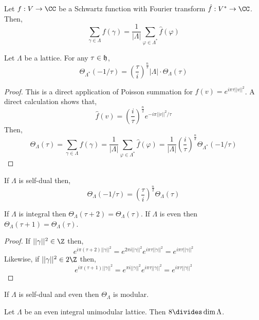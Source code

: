\documentclass[12pt]{article}
\begin{document}
\begin{thm}
Let $f : V \to \CC$ be a Schwartz function with Fourier transform $\hat{f} : V^* \to \CC$. Then,
\[ \sum_{\gamma \in \Lambda} f(\gamma) = \frac{1}{|\Lambda|} \sum_{\varphi \in \Lambda^*} \hat{f}(\varphi) \]
\end{thm}

\begin{prop}
Let $\Lambda$ be a lattice. For any $\tau \in \mathfrak{h}$,
\[ \Theta_{\Lambda^*}(-1/\tau) = \left( \frac{\tau}{i} \right)^{\frac{n}{2}} | \Lambda | \cdot  \Theta_{\Lambda}(\tau) \]
\end{prop}

\begin{proof}
This is a direct application of Poisson summation for $f(v) = e^{i \pi \tau || v ||^2}$. A direct calculation shows that, 
\[ \hat{f}(v) = \left( \frac{i}{\tau} \right)^{\frac{n}{2}} e^{-i \pi || v ||^2 / \tau} \] 
Then,
\[ \Theta_{\Lambda}(\tau) = \sum_{\gamma \in \Lambda} f(\gamma) = \frac{1}{| \Lambda |} \sum_{\varphi \in \Lambda^*} \hat{f}(\varphi) = \frac{1}{|\Lambda|} \left( \frac{i}{\tau} \right)^{\frac{n}{2}} \Theta_{\Lambda^*}(-1/\tau) \]
\end{proof}

\begin{cor}
If $\Lambda$ is self-dual then,
\[ \Theta_{\Lambda}(-1/\tau) = \left( \frac{\tau}{i} \right)^{\frac{n}{2}} \Theta_{\Lambda}(\tau) \]
\end{cor}

\begin{prop}
If $\Lambda$ is integral then $\Theta_{\Lambda}(\tau + 2) = \Theta_{\Lambda}(\tau)$. If $\Lambda$ is even then $\Theta_{\Lambda}(\tau + 1) = \Theta_{\Lambda}(\tau)$.
\end{prop}

\begin{proof}
If $||\gamma||^2 \in \Z$ then,
\[ e^{i \pi (\tau + 2) || \gamma ||^2} = e^{2 \pi i || \gamma ||^2} e^{i \pi \tau || \gamma ||^2} = e^{i \pi \tau || \gamma ||^2} \] Likewise, if $|| \gamma ||^2 \in 2 \Z$ then,
\[ e^{i \pi (\tau + 1) || \gamma ||^2} = e^{\pi i || \gamma ||^2} e^{i \pi \tau || \gamma ||^2} = e^{i \pi \tau || \gamma ||^2} \]
\end{proof}

\begin{cor}
If $\Lambda$ is self-dual and even then $\Theta_{\Lambda}$ is modular.
\end{cor}

\begin{thm}
Let $\Lambda$ be an even integral unimodular lattice. Then $8 \divides \dim{\Lambda}$. 
\end{thm}
\end{document}

